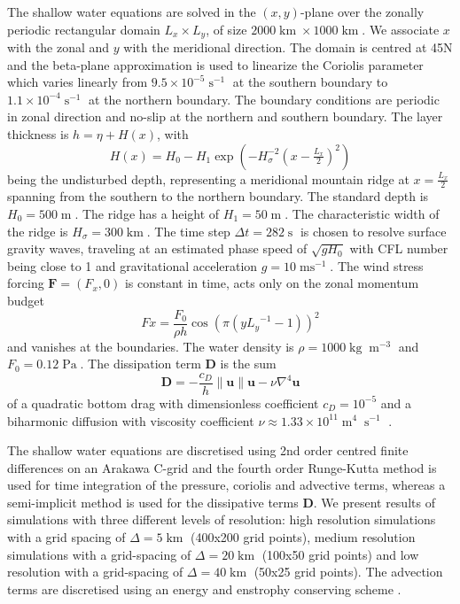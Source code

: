 \documentclass[draft]{agujournal2019}
\newcommand{\op}{\operatorname}
\begin{document}
The shallow water equations are solved in the $(x,y)$-plane over the zonally periodic rectangular domain $L_x \times L_y$, of size $2000\op{km} \times 1000\op{km}$. We associate $x$ with the zonal and $y$ with the meridional direction. The domain is centred at 45N and the beta-plane approximation \cite{Vallis2006} is used to linearize the Coriolis parameter which varies linearly from $9.5 \times 10^{-5}\op{s}^{-1}$ at the southern boundary to $1.1 \times 10^{-4}\op{s}^{-1}$ at the northern boundary. The boundary conditions are periodic in zonal direction and no-slip at the northern and southern boundary. The layer thickness is $h = \eta + H(x)$, with
\begin{equation}
H(x) = H_0 - H_1\exp\left(-H_\sigma^{-2}(x-\tfrac{L_x}{2})^2\right)
\end{equation}
being the undisturbed depth, representing a meridional mountain ridge at $x=\tfrac{L_x}{2}$ spanning from the southern to the northern boundary. The standard depth is $H_0 = 500\op{m}$. The ridge has a height of $H_1 = 50\op{m}$. The characteristic width of the ridge is $H_\sigma = 300\op{km}$. The time step $\Delta t = 282\op{s}$ is chosen to resolve surface gravity waves, traveling at an estimated phase speed of $\sqrt{gH_0}$ with CFL number being close to 1 and gravitational acceleration $g=10\op{ms}^{-1}$. The wind stress forcing $\mathbf{F} = (F_x,0)$ is constant in time, acts only on the zonal momentum budget
\begin{equation}
Fx = \frac{F_0}{\rho h} \cos\left(\pi\left(y{L_y}^{-1} - 1\right)\right)^2
\end{equation}
and vanishes at the boundaries. The water density is $\rho = 1000\op{kg}\op{m}^{-3}$ and $F_0 = 0.12\op{Pa}$. The dissipation term $\mathbf{D}$ is the sum
\begin{equation}
\mathbf{D} = -\frac{c_D}{h}\| \mathbf{u} \| \mathbf{u} - \nu \nabla^4 \mathbf{u}
\label{eq:diss}
\end{equation}
of a quadratic bottom drag with dimensionless coefficient $c_D = 10^{-5}$ \cite{Arbic2008} and a biharmonic diffusion with viscosity coefficient $\nu \approx 1.33\times10^{11} \op{m}^4\op{s}^{-1}$ \cite{Griffies2000}.

The shallow water equations are discretised using 2nd order centred finite differences on an Arakawa C-grid \cite{Arakawa1977} and the fourth order Runge-Kutta method \cite{Butcher2016} is used for time integration of the pressure, coriolis and advective terms, whereas a semi-implicit method is used for the dissipative terms $\mathbf{D}$. We present results of simulations with three different levels of resolution: high resolution simulations with a grid spacing of $\Delta = 5\operatorname{km}$ (400x200 grid points), medium resolution simulations with a grid-spacing of $\Delta = 20\operatorname{km}$ (100x50 grid points) and low resolution with a grid-spacing of $\Delta = 40\operatorname{km}$ (50x25 grid points). The advection terms are discretised using an energy and enstrophy conserving scheme \cite{Arakawa1990}.
\end{document}
